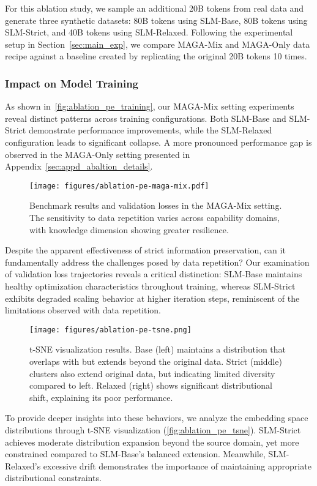 For this ablation study, we sample an additional 20B tokens from real data
and generate three synthetic datasets: 80B tokens using SLM-Base, 80B tokens using SLM-Strict, and 40B tokens using SLM-Relaxed.
Following the experimental setup in Section~\ref{sec:main_exp},
we compare MAGA-Mix and MAGA-Only data recipe against a baseline created by replicating the original 20B tokens 10 times.
\vspace{-0.5em}
\subsubsection{Impact on Model Training}
\vspace{-0.5em}
As shown in~\autoref{fig:ablation_pe_training}, our MAGA-Mix setting experiments reveal distinct patterns across training configurations.
Both SLM-Base and SLM-Strict demonstrate performance improvements, while the SLM-Relaxed configuration leads to significant collapse.
A more pronounced performance gap is observed in the MAGA-Only setting presented in Appendix~\ref{sec:appd_abaltion_details}.

\begin{figure}[h]
    \centering
    \texttt{[image: figures/ablation-pe-maga-mix.pdf]}
    \vspace{-2em}
    \caption{Benchmark results and validation losses in the MAGA-Mix setting. The sensitivity to data repetition varies across capability domains, with knowledge dimension showing greater resilience.}
    \label{fig:ablation_pe_training}
\end{figure}
\vspace{-0.5em}
Despite the apparent effectiveness of strict information preservation,
can it fundamentally address the challenges posed by data repetition?
Our examination of validation loss trajectories reveals a critical distinction:
SLM-Base maintains healthy optimization characteristics throughout training,
whereas SLM-Strict exhibits degraded scaling behavior at higher iteration steps,
reminiscent of the limitations observed with data repetition.


\begin{figure*}[h]
    \centering
    \vspace{-1em}
    \texttt{[image: figures/ablation-pe-tsne.png]}
    \vspace{-2.5em}
    \caption{t-SNE visualization results. Base (left) maintains a distribution that overlaps with but extends beyond the original data.
    Strict (middle) clusters also extend original data, but indicating limited diversity compared to left. Relaxed (right) shows significant distributional shift, explaining its poor performance.}
    \label{fig:ablation_pe_tsne}
\end{figure*}
To provide deeper insights into these behaviors, we analyze the embedding space distributions through t-SNE visualization (\autoref{fig:ablation_pe_tsne}).
SLM-Strict achieves moderate distribution expansion beyond the source domain,
yet more constrained compared to SLM-Base's balanced extension.
Meanwhile, SLM-Relaxed's excessive drift demonstrates the importance of maintaining appropriate distributional constraints.


